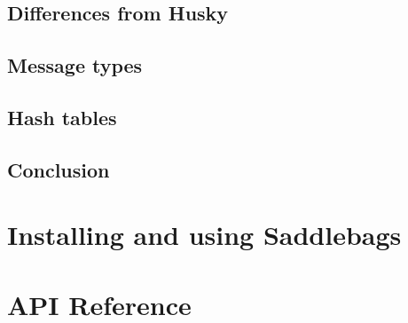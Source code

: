 \documentclass{uit-report}
\begin{document}
\section{Differences from Husky}
\section{Message types}
\section{Hash tables}
\section{Conclusion}


\pagebreak



\appendix
\chapter{Installing and using Saddlebags}
\chapter{API Reference}

\end{document}
